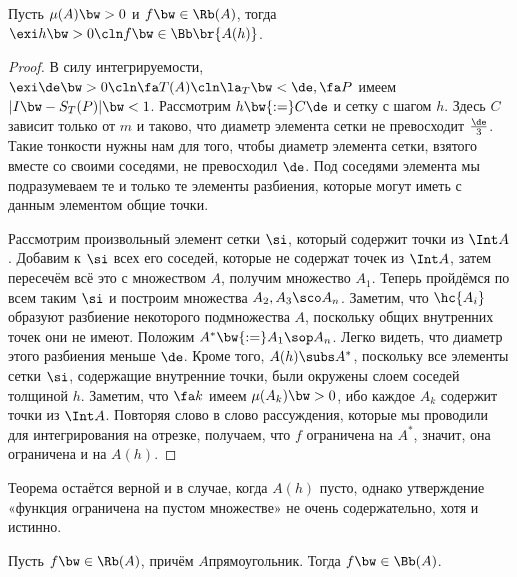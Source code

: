 \documentclass[a4paper]{article}
\begin{document}
\begin{theorem}
Пусть $\mu(A) \bw> 0$ и $f \bw\in \Rb(A)$, тогда $\exi h \bw> 0\cln f \bw\in \Bb\br{A(h)}$.
\end{theorem}
\begin{proof}
В силу интегрируемости, $\exi \de\bw>0\cln \fa T(A)\cln \la_T \bw< \de, \fa P$ имеем $|I \bw- S_T(P)| \bw< 1$.
Рассмотрим $h \bw{:=}C\de$ и сетку с шагом $h$. Здесь $C$ зависит только от $m$ и таково, что
диаметр элемента сетки не превосходит $\frac{\de}{3}$. Такие тонкости нужны нам для того, чтобы
диаметр элемента сетки, взятого вместе со своими соседями, не превосходил $\de$. Под соседями
элемента мы подразумеваем те и только те элементы разбиения, которые могут иметь с данным элементом
общие точки.

Рассмотрим произвольный элемент сетки $\si$, который содержит точки из $\Int A$. Добавим к $\si$
всех его соседей, которые не содержат точек из $\Int A$, затем пересечём всё это с множеством $A$,
получим множество $A_1$. Теперь пройдёмся по всем таким $\si$ и построим множества $A_2,A_3\sco
A_n$. Заметим, что $\hc{A_i}$ образуют разбиение некоторого подмножества $A$, поскольку общих
внутренних точек они не имеют. Положим $A^* \bw{:=}A_1\sop A_n$. Легко видеть, что диаметр этого
разбиения меньше $\de$. Кроме того, $A(h) \subs A^*$, поскольку все элементы сетки $\si$,
содержащие внутренние точки, были окружены слоем соседей толщиной $h$. Заметим, что $\fa k$ имеем
$\mu(A_k) \bw> 0$, ибо каждое $A_k$ содержит точки из $\Int A$. Повторяя слово в слово рассуждения,
которые мы проводили для интегрирования на отрезке, получаем, что $f$ ограничена на $A^*$, значит,
она ограничена и на $A(h)$.
\end{proof}

\begin{note}
Теорема остаётся верной и в случае, когда $A(h)$ пусто, однако утверждение «функция ограничена на
пустом множестве» не очень содержательно, хотя и истинно.
\end{note}

\begin{imp}
Пусть $f \bw\in \Rb(A)$, причём $A$\т прямоугольник. Тогда $f \bw\in \Bb(A)$.
\end{imp}
\end{document}
